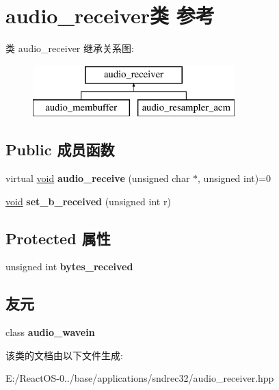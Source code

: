 \hypertarget{classaudio__receiver}{}\section{audio\+\_\+receiver类 参考}
\label{classaudio__receiver}
类 audio\+\_\+receiver 继承关系图\+:\begin{figure}[H]
\begin{center}
\leavevmode
\includegraphics[height=2.000000cm]{classaudio__receiver}
\end{center}
\end{figure}
\subsection*{Public 成员函数}
\begin{DoxyCompactItemize}
\item 
\mbox{\label{classaudio__receiver_ab32f19cbd3134461b8fa794d8e65978c}} 
virtual \hyperlink{interfacevoid}{void} {\bfseries audio\+\_\+receive} (unsigned char $\ast$, unsigned int)=0
\item 
\mbox{\label{classaudio__receiver_a6b2b502b357d144c3ef3e0af341a137f}} 
\hyperlink{interfacevoid}{void} {\bfseries set\+\_\+b\+\_\+received} (unsigned int r)
\end{DoxyCompactItemize}
\subsection*{Protected 属性}
\begin{DoxyCompactItemize}
\item 
\mbox{\label{classaudio__receiver_ac563b57bd589a00ab337f0c5a6c0266d}} 
unsigned int {\bfseries bytes\+\_\+received}
\end{DoxyCompactItemize}
\subsection*{友元}
\begin{DoxyCompactItemize}
\item 
\mbox{\label{classaudio__receiver_a25dd204cbb9c12fb96936020d80e1c5f}} 
class {\bfseries audio\+\_\+wavein}
\end{DoxyCompactItemize}


该类的文档由以下文件生成\+:\begin{DoxyCompactItemize}
\item 
E\+:/\+React\+O\+S-\/0../base/applications/sndrec32/audio\+\_\+receiver.\+hpp\end{DoxyCompactItemize}
